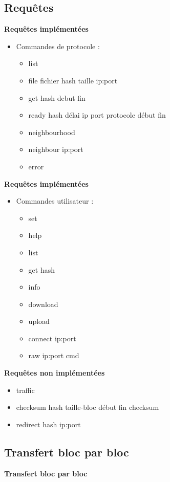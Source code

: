 \documentclass{beamer}
\begin{document}
\begin{frame}
    \section{Requêtes}

    \textbf{Requêtes implémentées}
    \begin{itemize}
        \item Commandes de protocole :
            \begin{itemize}
                \item list
                \item file fichier hash taille ip:port
                \item get hash debut fin
                \item ready hash délai ip port protocole début fin
                \item neighbourhood
                \item neighbour ip:port
                \item error
            \end{itemize}
    \end{itemize}

\end{frame}

\begin{frame}
    \textbf{Requêtes implémentées}
    \begin{itemize}
        \item Commandes utilisateur :
            \begin{itemize}
                \item set
                \item help
                \item list
                \item get hash
                \item info
                \item download
                \item upload
                \item connect ip:port
                \item raw ip:port cmd
            \end{itemize}
    \end{itemize}
\end{frame}

\begin{frame}
    \textbf{Requêtes non implémentées}
    \begin{itemize}
        \item traffic
        \item checksum hash taille-bloc début fin checksum
        \item redirect hash ip:port
    \end{itemize}
\end{frame}

\begin{frame}
    \section{Transfert bloc par bloc}

    \textbf{Transfert bloc par bloc}
\end{frame}
\end{document}
